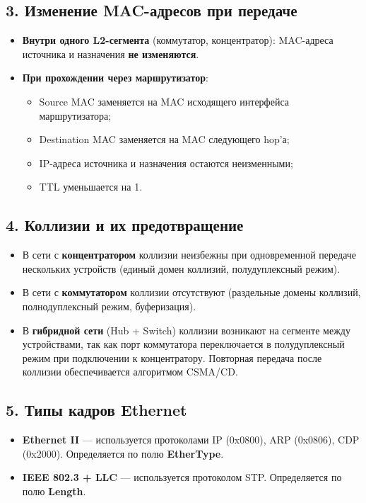 \subsection*{3. Изменение MAC-адресов при передаче}
\begin{itemize}
    \item \textbf{Внутри одного L2-сегмента} (коммутатор, концентратор): MAC-адреса источника и назначения \textbf{не изменяются}.
    \item \textbf{При прохождении через маршрутизатор}:
    \begin{itemize}
        \item Source MAC заменяется на MAC исходящего интерфейса маршрутизатора;
        \item Destination MAC заменяется на MAC следующего hop'а;
        \item IP-адреса источника и назначения остаются неизменными;
        \item TTL уменьшается на 1.
    \end{itemize}
\end{itemize}

\subsection*{4. Коллизии и их предотвращение}
\begin{itemize}
    \item В сети с \textbf{концентратором} коллизии неизбежны при одновременной передаче нескольких устройств (единый домен коллизий, полудуплексный режим).
    \item В сети с \textbf{коммутатором} коллизии отсутствуют (раздельные домены коллизий, полнодуплексный режим, буферизация).
    \item В \textbf{гибридной сети} (Hub + Switch) коллизии возникают на сегменте между устройствами, так как порт коммутатора переключается в полудуплексный режим при подключении к концентратору. Повторная передача после коллизии обеспечивается алгоритмом CSMA/CD.
\end{itemize}

\subsection*{5. Типы кадров Ethernet}
\begin{itemize}
    \item \textbf{Ethernet II} — используется протоколами IP (0x0800), ARP (0x0806), CDP (0x2000). Определяется по полю \textbf{EtherType}.
    \item \textbf{IEEE 802.3 + LLC} — используется протоколом STP. Определяется по полю \textbf{Length}.
\end{itemize}

